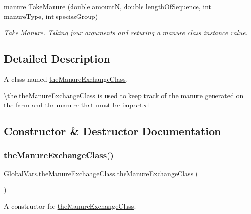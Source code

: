 \begin{DoxyCompactItemize}
\mbox{\hyperlink{classmanure}{manure}} \mbox{\hyperlink{class_global_vars_1_1the_manure_exchange_class_a0bf102dc17ba51eb5874fef24bc979bc}{Take\+Manure}} (double amountN, double length\+Of\+Sequence, int manure\+Type, int species\+Group)
\begin{DoxyCompactList}\small\item\em Take Manure. Taking four arguments and returing a manure class instance value. \end{DoxyCompactList}\end{DoxyCompactItemize}


\subsection{Detailed Description}
A class named \mbox{\hyperlink{class_global_vars_1_1the_manure_exchange_class}{the\+Manure\+Exchange\+Class}}. 

\textbackslash{}the \mbox{\hyperlink{class_global_vars_1_1the_manure_exchange_class}{the\+Manure\+Exchange\+Class}} is used to keep track of the manure generated on the farm and the manure that must be imported. 

\subsection{Constructor \& Destructor Documentation}
\mbox{\label{class_global_vars_1_1the_manure_exchange_class_a81c638e25498afce3347dcb34bf1744a}} 
\subsubsection{\texorpdfstring{theManureExchangeClass()}{theManureExchangeClass()}}
{\footnotesize\ttfamily Global\+Vars.\+the\+Manure\+Exchange\+Class.\+the\+Manure\+Exchange\+Class (\begin{DoxyParamCaption}{ }\end{DoxyParamCaption})\hspace{0.3cm}{\ttfamily [inline]}}



A constructor for \mbox{\hyperlink{class_global_vars_1_1the_manure_exchange_class}{the\+Manure\+Exchange\+Class}}. 

